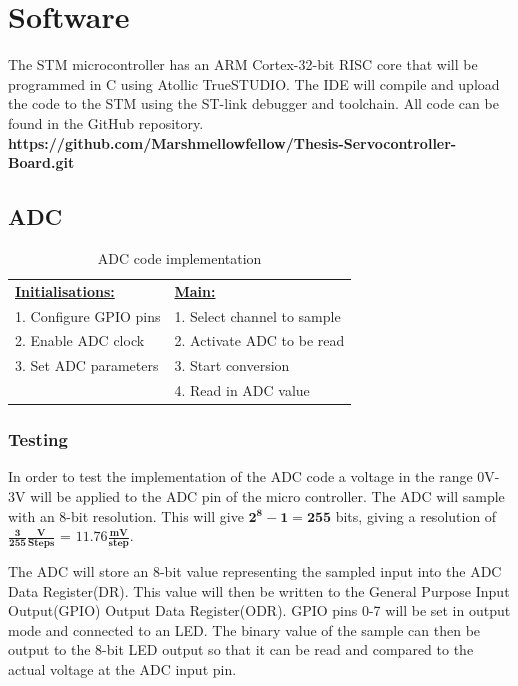 \chapter{Software}
\vspace{-19mm}
The STM microcontroller has an ARM Cortex-32-bit RISC core that will be programmed in C using Atollic TrueSTUDIO. The IDE will compile and upload the code to the STM using the ST-link debugger and toolchain. All code can be found in the GitHub repository. \textbf{https://github.com/Marshmellowfellow/Thesis-Servocontroller-Board.git}
\vspace{-12mm}

\section{ADC}
\vspace{-8mm}

\begin{table}[H]
\centering
    \begin{tabular}{|l|l|}
    \hline
            \textbf{\underline{Initialisations:}}&\textbf{\underline{Main:}}\\
            1. Configure GPIO pins & 1. Select channel to sample\\
            2. Enable ADC clock    & 2. Activate ADC to be read\\
            3. Set ADC parameters  & 3. Start conversion\\
                                   & 4. Read in ADC value\\
                                  \hline
    \end{tabular}
    \caption{ADC code implementation}
\end{table}

\vspace{-12mm}
\subsection{Testing}
\vspace{-7mm}
In order to test the implementation of the ADC code a voltage in the range 0V-3V will be applied to the ADC pin of the micro controller. The ADC will sample with an 8-bit resolution. This will give $\mathbf{2^8 - 1 = 255}$ bits, giving a resolution of $\mathbf{\frac{3}{255}\frac{V}{Steps}}$ = $\mathbf{11.76\frac{mV}{step}}$. 
\vspace{-9mm}

The ADC will store an 8-bit value representing the sampled input into the ADC Data Register(DR). This value will then be written to the General Purpose Input Output(GPIO) Output Data Register(ODR). GPIO pins 0-7 will be set in output mode and connected to an LED. The binary value of the sample can then be output to the 8-bit LED output so that it can be read and compared to the actual voltage at the ADC input pin. 


